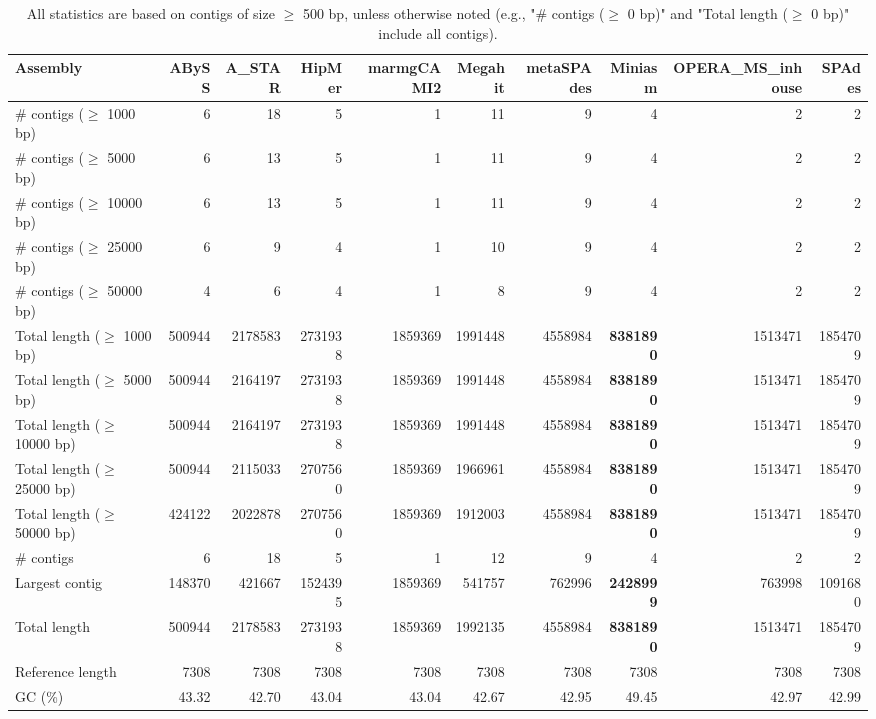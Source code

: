\documentclass[12pt,a4paper]{article}
\begin{document}
\begin{table}[ht]
\begin{center}
\caption{All statistics are based on contigs of size $\geq$ 500 bp, unless otherwise noted (e.g., "\# contigs ($\geq$ 0 bp)" and "Total length ($\geq$ 0 bp)" include all contigs).}
\begin{tabular}{|l*{9}{|r}|}
\hline
Assembly & ABySS & A\_STAR & HipMer & marmgCAMI2 & Megahit & metaSPAdes & Miniasm & OPERA\_MS\_inhouse & SPAdes \\ \hline
\# contigs ($\geq$ 1000 bp) & 6 & 18 & 5 & 1 & 11 & 9 & 4 & 2 & 2 \\ \hline
\# contigs ($\geq$ 5000 bp) & 6 & 13 & 5 & 1 & 11 & 9 & 4 & 2 & 2 \\ \hline
\# contigs ($\geq$ 10000 bp) & 6 & 13 & 5 & 1 & 11 & 9 & 4 & 2 & 2 \\ \hline
\# contigs ($\geq$ 25000 bp) & 6 & 9 & 4 & 1 & 10 & 9 & 4 & 2 & 2 \\ \hline
\# contigs ($\geq$ 50000 bp) & 4 & 6 & 4 & 1 & 8 & 9 & 4 & 2 & 2 \\ \hline
Total length ($\geq$ 1000 bp) & 500944 & 2178583 & 2731938 & 1859369 & 1991448 & 4558984 & {\bf 8381890} & 1513471 & 1854709 \\ \hline
Total length ($\geq$ 5000 bp) & 500944 & 2164197 & 2731938 & 1859369 & 1991448 & 4558984 & {\bf 8381890} & 1513471 & 1854709 \\ \hline
Total length ($\geq$ 10000 bp) & 500944 & 2164197 & 2731938 & 1859369 & 1991448 & 4558984 & {\bf 8381890} & 1513471 & 1854709 \\ \hline
Total length ($\geq$ 25000 bp) & 500944 & 2115033 & 2707560 & 1859369 & 1966961 & 4558984 & {\bf 8381890} & 1513471 & 1854709 \\ \hline
Total length ($\geq$ 50000 bp) & 424122 & 2022878 & 2707560 & 1859369 & 1912003 & 4558984 & {\bf 8381890} & 1513471 & 1854709 \\ \hline
\# contigs & 6 & 18 & 5 & 1 & 12 & 9 & 4 & 2 & 2 \\ \hline
Largest contig & 148370 & 421667 & 1524395 & 1859369 & 541757 & 762996 & {\bf 2428999} & 763998 & 1091680 \\ \hline
Total length & 500944 & 2178583 & 2731938 & 1859369 & 1992135 & 4558984 & {\bf 8381890} & 1513471 & 1854709 \\ \hline
Reference length & 7308 & 7308 & 7308 & 7308 & 7308 & 7308 & 7308 & 7308 & 7308 \\ \hline
GC (\%) & 43.32 & 42.70 & 43.04 & 43.04 & 42.67 & 42.95 & 49.45 & 42.97 & 42.99 \\ \hline

\end{tabular}
\end{center}
\end{table}
\end{document}
